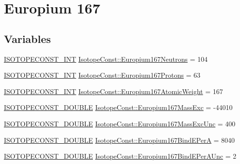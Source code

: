 \hypertarget{group___isotope_const-_europium-_eu167}{}\section{Europium 167}
\label{group___isotope_const-_europium-_eu167}
\subsection*{Variables}
\begin{DoxyCompactItemize}
\item 
\mbox{\hyperlink{group___isotope_const-_macros_ga5f18360b3e99483a35c32d789e62621c}{I\+S\+O\+T\+O\+P\+E\+C\+O\+N\+S\+T\+\_\+\+I\+NT}} \mbox{\hyperlink{group___isotope_const-_europium-_eu167_ga86856d6ef8cdb75ee6fd477ae229eaa8}{Isotope\+Const\+::\+Europium167\+Neutrons}} = 104
\item 
\mbox{\hyperlink{group___isotope_const-_macros_ga5f18360b3e99483a35c32d789e62621c}{I\+S\+O\+T\+O\+P\+E\+C\+O\+N\+S\+T\+\_\+\+I\+NT}} \mbox{\hyperlink{group___isotope_const-_europium-_eu167_gafe79ea41381b7264436957e98dbc9bec}{Isotope\+Const\+::\+Europium167\+Protons}} = 63
\item 
\mbox{\hyperlink{group___isotope_const-_macros_ga5f18360b3e99483a35c32d789e62621c}{I\+S\+O\+T\+O\+P\+E\+C\+O\+N\+S\+T\+\_\+\+I\+NT}} \mbox{\hyperlink{group___isotope_const-_europium-_eu167_ga33f1de98c8043e1efa4af791f0e192b8}{Isotope\+Const\+::\+Europium167\+Atomic\+Weight}} = 167
\item 
\mbox{\hyperlink{group___isotope_const-_macros_ga8f45a7272ce02c0b4c65c44636ed719a}{I\+S\+O\+T\+O\+P\+E\+C\+O\+N\+S\+T\+\_\+\+D\+O\+U\+B\+LE}} \mbox{\hyperlink{group___isotope_const-_europium-_eu167_gac1ce9bd95251d17c3152951e01a50b25}{Isotope\+Const\+::\+Europium167\+Mass\+Exc}} = -\/44010
\item 
\mbox{\hyperlink{group___isotope_const-_macros_ga8f45a7272ce02c0b4c65c44636ed719a}{I\+S\+O\+T\+O\+P\+E\+C\+O\+N\+S\+T\+\_\+\+D\+O\+U\+B\+LE}} \mbox{\hyperlink{group___isotope_const-_europium-_eu167_ga269cd03f42d908bfe3b5f18f74fa406b}{Isotope\+Const\+::\+Europium167\+Mass\+Exc\+Unc}} = 400
\item 
\mbox{\hyperlink{group___isotope_const-_macros_ga8f45a7272ce02c0b4c65c44636ed719a}{I\+S\+O\+T\+O\+P\+E\+C\+O\+N\+S\+T\+\_\+\+D\+O\+U\+B\+LE}} \mbox{\hyperlink{group___isotope_const-_europium-_eu167_ga1725f08ddbb18b434dd937ce3feb93fa}{Isotope\+Const\+::\+Europium167\+Bind\+E\+PerA}} = 8040
\item 
\mbox{\hyperlink{group___isotope_const-_macros_ga8f45a7272ce02c0b4c65c44636ed719a}{I\+S\+O\+T\+O\+P\+E\+C\+O\+N\+S\+T\+\_\+\+D\+O\+U\+B\+LE}} \mbox{\hyperlink{group___isotope_const-_europium-_eu167_gad9ed911c7dbdfb795d33a43683ae9b0d}{Isotope\+Const\+::\+Europium167\+Bind\+E\+Per\+A\+Unc}} = 2

\end{DoxyCompactItemize}
